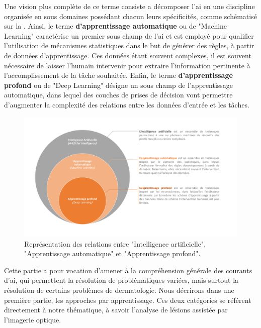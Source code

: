 Une vision plus complète de ce terme consiste a décomposer l'\gls{ai} en une discipline organisée en sous domaines possédant chacun leurs spécificités, comme schématisé sur la . Ainsi, le terme \textbf{d'apprentissage automatique} ou de "Machine Learning" caractérise un premier sous champ de l'\gls{ai} et est employé pour qualifier l'utilisation de mécanismes statistiques dans le but de générer des règles, à partir de données d'apprentissage. Ces données étant souvent complexes, il est souvent nécessaire de laisser l'humain intervenir pour extraire l'information pertinente à l'accomplissement de la tâche souhaitée. Enfin, le terme \textbf{d'apprentissage profond} ou de "Deep Learning" désigne un sous champ de l'apprentissage automatique, dans lequel des couches de prises de décision vont permettre d'augmenter la complexité des relations entre les données d'entrée et les tâches.\par

\addtocounter{footnote}{1}

\begin{figure}[H]
    \centering
    \includegraphics[width=\linewidth]{contents/chapter_3/resources/scheme_overview_ia.pdf}
    \caption{Représentation des relations entre "Intelligence artificielle", "Apprentissage automatique" et "Apprentissage profond".}
    \label{fig:scheme_overview_ia}
\end{figure}\par

Cette partie a pour vocation d’amener à la compréhension générale des courants d’\gls{ai}, qui permettent la résolution de problématiques variées, mais surtout la résolution de certains problèmes de dermatologie. Nous décrirons dans une première partie, les approches par apprentissage. Ces deux catégories se référent directement à notre thématique, à savoir l’analyse de lésions assistée par l’imagerie optique.\par

